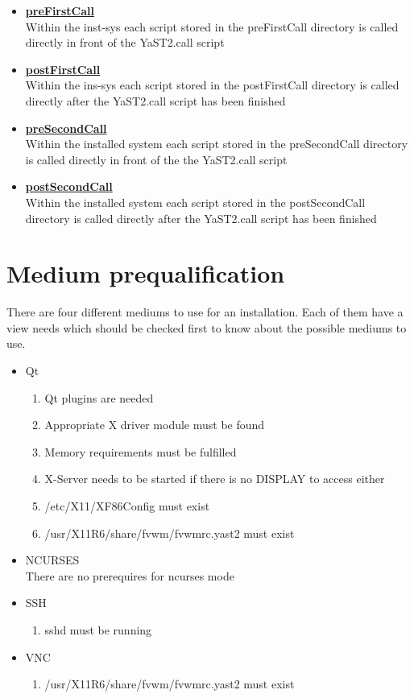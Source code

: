 \begin{itemize}
\item \textbf{\underline{preFirstCall}}\\
	Within the inst-sys each script stored in the preFirstCall directory is
	called directly in front of the YaST2.call script
\item \textbf{\underline{postFirstCall}}\\
	Within the ins-sys each script stored in the postFirstCall directory is
	called directly after the YaST2.call script has been finished
\item \textbf{\underline{preSecondCall}}\\
	Within the installed system each script stored in the preSecondCall
	directory is called directly in front of the the YaST2.call script
\item \textbf{\underline{postSecondCall}}\\
	Within the installed system each script stored in the postSecondCall
	directory is called directly after the YaST2.call script has been
	finished
\end{itemize}

\section{Medium prequalification}
There are four different mediums to use for an installation. Each
of them have a view needs which should be checked first to know
about the possible mediums to use.

\begin{itemize}
\item Qt
	\begin{enumerate}
	\item Qt plugins are needed
	\item Appropriate X driver module must be found
	\item Memory requirements must be fulfilled
	\item X-Server needs to be started if there is no DISPLAY to access either
	\item /etc/X11/XF86Config must exist
	\item /usr/X11R6/share/fvwm/fvwmrc.yast2 must exist
	\end{enumerate}
\item NCURSES\\
	There are no prerequires for ncurses mode
\item SSH
	\begin{enumerate}
	\item sshd must be running
	\end{enumerate}
\item VNC
	\begin{enumerate}
	\item /usr/X11R6/share/fvwm/fvwmrc.yast2 must exist
	\end{enumerate}
\end{itemize}


